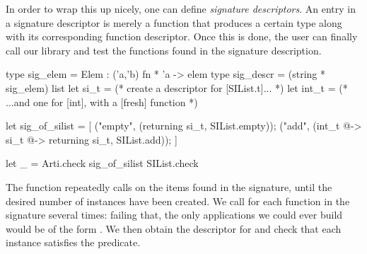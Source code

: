 In order to wrap this up nicely, one can define \emph{signature descriptors}. An
entry in a signature descriptor is merely a function that produces a certain
type  along with its corresponding function descriptor. Once this is
done, the user can finally call our library and test the functions found in the
signature description.
%
\begin{ocamlcode}
type sig_elem = Elem : ('a,'b) fn * 'a -> elem
type sig_descr = (string * sig_elem) list
let si_t  =
  (* create a descriptor for [SIList.t]... *)
let int_t =
  (* ...and one for [int], with a [fresh] function *)

let sig_of_silist = [
  ("empty", (returning si_t, SIList.empty));
  ("add", (int_t @-> si_t @-> returning si_t, SIList.add));
]

let _ =
  Arti.check sig_of_silist SIList.check
\end{ocamlcode}
%
The  function repeatedly calls  on the items found in
the signature, until the desired number of instances have been created. We call
 for each function in the signature several times: failing that, the only
applications we could ever build would be of the form . We
then obtain the descriptor for  and check that each instance
satisfies the  predicate.
